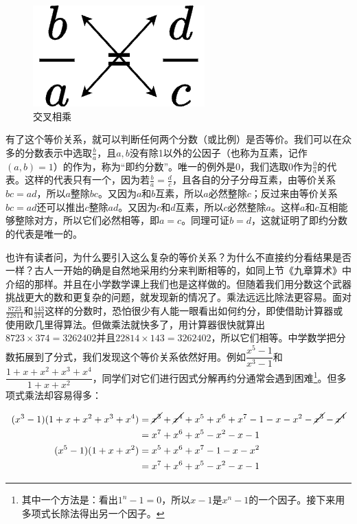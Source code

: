 \documentclass[b5paper]{ctexart}
\begin{document}
\begin{figure}[htbp]
 \centering
 \includegraphics[scale=0.4]{img/cross-mul}
 \caption{交叉相乘}
 \label{fig:cross-mul}
\end{figure}

有了这个等价关系，就可以判断任何两个分数（或比例）是否等价。我们可以在众多的分数表示中选取$\frac{b}{a}$，且$a, b$没有除1以外的公因子（也称为互素，记作$(a, b) = 1$）的作为，称为“即约分数”。唯一的例外是0，我们选取0作为$\frac{0}{a}$的代表。这样的代表只有一个，因为若$\frac{b}{a} = \frac{d}{c}$，且各自的分子分母互素，由等价关系$bc = ad$，所以$a$整除$bc$。又因为$a$和$b$互素，所以$a$必然整除$c$；反过来由等价关系$bc = ad$还可以推出$c$整除$ad$。又因为$c$和$d$互素，所以$c$必然整除$a$。这样$a$和$c$互相能够整除对方，所以它们必然相等，即$a = c$。同理可证$b = d$，这就证明了即约分数的代表是唯一的。

也许有读者问，为什么要引入这么复杂的等价关系？为什么不直接约分看结果是否一样？古人一开始的确是自然地采用约分来判断相等的，如同上节《九章算术》中介绍的那样。并且在小学数学课上我们也是这样做的。但随着我们用分数这个武器挑战更大的数和更复杂的问题，就发现新的情况了。乘法远远比除法更容易。面对$\frac{8723}{22814}$和$\frac{143}{374}$这样的分数时，恐怕很少有人能一眼看出如何约分，即使借助计算器或使用欧几里得算法。但做乘法就快多了，用计算器很快就算出$8723 \times 374 = 3262402$并且$22814 \times 143 = 3262402$，所以它们相等。中学数学把分数拓展到了分式，我们发现这个等价关系依然好用。例如$\dfrac{x^5 - 1}{x^3 - 1}$和$\dfrac{1 + x + x^2 + x^3 + x^4}{1 + x + x^2}$，同学们对它们进行因式分解再约分通常会遇到困难\footnote{其中一个方法是：看出$1^n - 1 = 0$，所以$x-1$是$x^n-1$的一个因子。接下来用多项式长除法得出另一个因子。}。但多项式乘法却容易得多：

\begin{align*}
(x^3 - 1)(1 + x + x^2 + x^3 + x^4) &= \cancel{x^3} + \cancel{x^4} + x^5 + x^6 + x^7 - 1 - x - x^2 - \cancel{x^3} - \cancel{x^4} \\
  &= x^7 + x^6 + x^5 - x^2 - x - 1 \\
(x^5 - 1)(1 + x + x^2) &= x^5 + x^6 + x^7 - 1 - x - x^2 \\
  &= x^7 + x^6 + x^5 - x^2 - x - 1
\end{align*}
\end{document}
